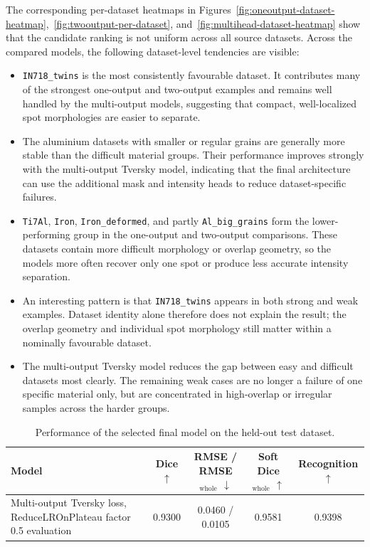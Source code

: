 The corresponding per-dataset heatmaps in Figures~\ref{fig:oneoutput-dataset-heatmap},~\ref{fig:twooutput-per-dataset}, and~\ref{fig:multihead-dataset-heatmap} show that the candidate ranking is not uniform across all source datasets. Across the compared models, the following dataset-level tendencies are visible:
\begin{itemize}
    \item \texttt{IN718\_twins} is the most consistently favourable dataset. It contributes many of the strongest one-output and two-output examples and remains well handled by the multi-output models, suggesting that compact, well-localized spot morphologies are easier to separate.
    \item The aluminium datasets with smaller or regular grains are generally more stable than the difficult material groups. Their performance improves strongly with the multi-output Tversky model, indicating that the final architecture can use the additional mask and intensity heads to reduce dataset-specific failures.
    \item \texttt{Ti7Al}, \texttt{Iron}, \texttt{Iron\_deformed}, and partly \texttt{Al\_big\_grains} form the lower-performing group in the one-output and two-output comparisons. These datasets contain more difficult morphology or overlap geometry, so the models more often recover only one spot or produce less accurate intensity separation.
    \item An interesting pattern is that \texttt{IN718\_twins} appears in both strong and weak examples. Dataset identity alone therefore does not explain the result; the overlap geometry and individual spot morphology still matter within a nominally favourable dataset.
    \item The multi-output Tversky model reduces the gap between easy and difficult datasets most clearly. The remaining weak cases are no longer a failure of one specific material only, but are concentrated in high-overlap or irregular samples across the harder groups.
\end{itemize}

\begin{table}[htbp]
\centering
\caption{Performance of the selected final model on the held-out test dataset.}
\label{tab:final_model_test_evaluation}
\begin{tabular}{p{5.2cm}cccc}
\toprule
Model &
Dice $\uparrow$ &
RMSE / RMSE$_{\mathrm{whole}}$ $\downarrow$ &
Soft Dice$_{\mathrm{whole}}$ $\uparrow$ &
Recognition $\uparrow$ \\
\midrule
Multi-output Tversky loss, ReduceLROnPlateau factor 0.5 evaluation
& 0.9300
& 0.0460 / 0.0105
& 0.9581
& 0.9398 \\
\bottomrule
\end{tabular}
\end{table}

